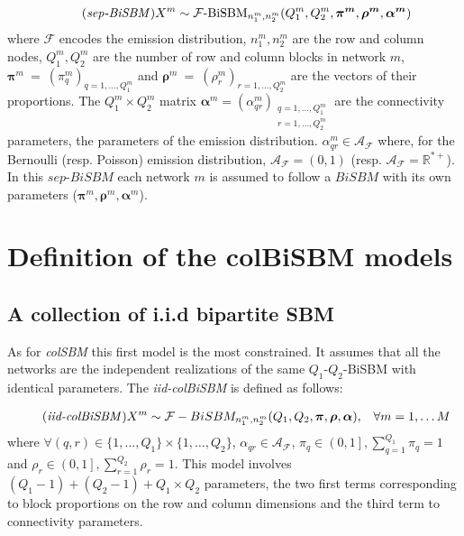 \documentclass[12pt,a4paper]{report}
\begin{document}
\begin{equation}
    \tag{\emph{sep-BiSBM}}
    X^m \sim \mathcal{F}\text{-BiSBM}_{n_1^m,n_2^m}(Q_1^m, Q_2^m, \bm{\pi^m}, \bm{\rho^m}, \bm{\alpha^m})
\end{equation}
where $\mathcal{F}$ encodes the emission distribution, $n_1^m,n_2^m$ are the row
and column nodes, $Q_1^m, Q_2^m$ are the number of row and column blocks in
network $m$, $\bm{\pi}^m~=~{(\pi^m_q)}_{q=1,\dots,Q_1^m}$ and
$\bm{\rho}^m~=~{(\rho^m_r)}_{r=1,\dots,Q_2^m}$ are the vectors  of their
proportions. The $Q_1^m \times Q_2^m$ matrix
$\bm{\alpha}^m = {(\alpha^m_{qr})}_{\substack{q = 1,\dots,Q_1^m \\ r = 1,\dots,Q_2^m}}$
are the connectivity parameters, the parameters of the emission distribution.
$\alpha^m_{qr}\in\mathcal{A}_{\mathcal{F}}$ where, for the Bernoulli
(resp. Poisson) emission distribution, $\mathcal{A}_{\mathcal{F}} = (0,1)$ (resp.
$\mathcal{A}_{\mathcal{F}} = \mathbb{R}^{*+}$). In this $sep$-$BiSBM$ each
network $m$ is assumed to follow a $BiSBM$ with its own parameters ($\bm{\pi}^m,
\bm{\rho}^m, \bm{\alpha}^m$).

\section{Definition of the colBiSBM models}\label{sec:definition-of-the-colbisbm-models}

\subsection{A collection of i.i.d bipartite SBM}\label{ssec:a-collection-of-i-i-d-bipartite-sbm}
As for \emph{colSBM} this first model is the most constrained. It assumes
that all the networks are the independent realizations of the same $Q_1$-$Q_2$-BiSBM
with identical parameters. The \emph{iid-colBiSBM} is defined as follows:

\begin{align}
    \tag{\emph{iid-colBiSBM}}
    X^m \sim \mathcal{F}-BiSBM_{n_1^m,n_2^m} (Q_1, Q_2, \bm{\pi}, \bm{\rho}, \bm{\alpha}), && \forall m = 1, \dots M
\end{align}
where $\forall (q,r) \in \{1,\dots,Q_1\}\times\{1,\dots,Q_2\}$, $\alpha_{qr} \in \mathcal{A}_{\mathcal{F}}$,
$\pi_q \in \left( 0,1 \right], \sum_{q=1}^{Q_1} \pi_q = 1 $ and $\rho_r \in \left( 0,1 \right], \sum_{r=1}^{Q_2} \rho_r = 1 $.
This model involves $(Q_1 - 1) + (Q_2 - 1) + Q_1\times Q_2$ parameters, the two
first terms corresponding to block proportions on the row and column dimensions
and the third term to connectivity parameters.
\end{document}
